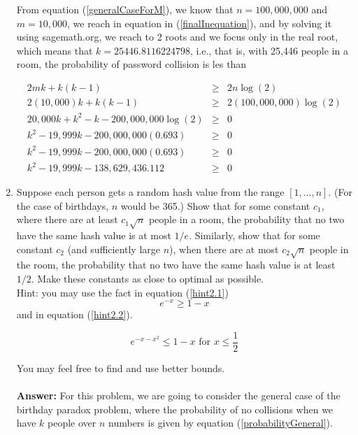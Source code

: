 \documentclass[tikz, 12pt]{scrartcl}
\begin{document}
\begin{enumerate}
	From equation (\ref{generalCaseForM}), we know that $n = 100,000,000$ and $m = 10,000$, we reach in equation in (\ref{finalInequation}), and by solving it using sagemath.org, we reach to 2 roots and we focus only in the real root, which means that $k = 25446.8116224798$, i.e., that is, with 25,446 people in a room, the probability of password collision is les than 
	
	\begin{eqnarray}
	2mk + k(k - 1)						&	\geq	&	2n \log(2) \nonumber \\
	2(10,000)k + k(k - 1)					&	\geq	&	2(100,000,000) \log(2) \nonumber \\
	20,000k + k^2 - k - 200,000,000 \log(2)	&	\geq	& 	0 \nonumber \\
	k^2 - 19,999k - 200,000,000(0.693)		&	\geq	&	0 \nonumber \\
	k^2 - 19,999k - 200,000,000(0.693)		&	\geq	&	0 \nonumber \\
	k^2 - 19,999k - 138,629,436.112		&	\geq	&	0 \label{finalInequation}
	\end{eqnarray}
	
	\item Suppose each person gets a random hash value from the range $[1, \ldots, n]$. (For the case of birthdays, $n$ would be 365.) Show that for some constant $c_1$, where there are at least $c_1 \sqrt{n}$ people in a room, the probability that no two have the same hash value is at most $1/e$. Similarly, show that for some constant $c_2$ (and sufficiently large $n$), when there are at most $c_2 \sqrt{n}$ people in the room, the probability that no two have the same hash value is at least $1/2$. Make these constants as close to optimal as possible.\\
	Hint: you may use the fact in equation (\ref{hint2.1})
	\begin{equation}\label{hint2.1}
		e^{-x} \geq 1 - x
	\end{equation}
	and in equation (\ref{hint2.2}).
	
	\begin{equation}\label{hint2.2}
	e^{-x - x^2} \leq 1 - x \mbox{ for } x \leq \frac{1}{2}
	\end{equation}
	
	You may feel free to find and use better bounds.\\
	\\
	\textbf{Answer: } For this problem, we are going to consider the general case of the birthday paradox problem, where the probability of no collisions when we have $k$ people over $n$ numbers is given by equation (\ref{probabilityGeneral}).
	

\end{enumerate}
\end{document}
